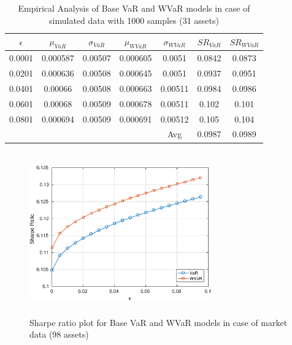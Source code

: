 \documentclass[12pt]{article}
\numberwithin{equation}{section}
\begin{document}
\begin{table}[!h]
\centering
\captionsetup{justification=centering}
\begin{tabular}{||c|c|c|c|c|c|c||}
\hline
$\epsilon$ & $\mu_{VaR}$ & $\sigma_{VaR}$ & $\mu_{WVaR}$ & $\sigma_{WVaR}$ & $SR_{VaR}$ & $SR_{WVaR}$\\
\hline
0.0001 & 0.000587 & 0.00507 & 0.000605 & 0.0051 & 0.0842 & 0.0873 \\
0.0201 & 0.000636 & 0.00508 & 0.000645 & 0.0051 & 0.0937 & 0.0951 \\
0.0401 & 0.00066 & 0.00508 & 0.000663 & 0.00511 & 0.0984 & 0.0986 \\
0.0601 & 0.00068 & 0.00509 & 0.000678 & 0.00511 & 0.102 & 0.101 \\
0.0801 & 0.000694 & 0.00509 & 0.000691 & 0.00512 & 0.105 & 0.104 \\
\hline
& & & & Avg & 0.0987 & 0.0989 \\
\hline
\end{tabular}
\caption{Empirical Analysis of Base VaR and WVaR models in case of simulated data with 1000 samples (31 assets)}
\label{tab:5.3}
\end{table}

\begin{figure}[!h]
\centering
\includegraphics[height=7.0cm,width=0.7\textwidth]{VaR/bse100_market/sr_cheb.eps}
\caption{Sharpe ratio plot for Base VaR and WVaR models in case of market data (98 assets)}
\label{fig:5.4}
\end{figure}
\end{document}
